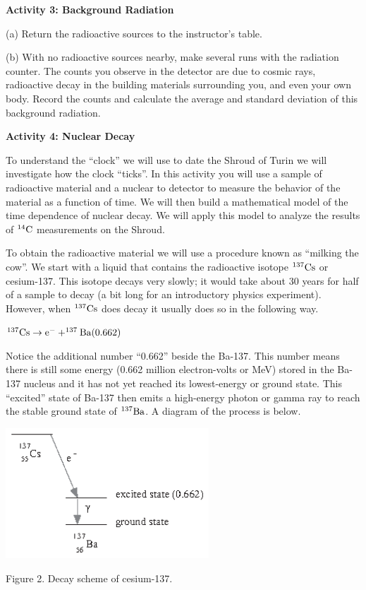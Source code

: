 \textbf{Activity 3: Background Radiation}

(a) Return the radioactive sources to the instructor's table.

(b) With no radioactive sources nearby, make several runs with the radiation counter.
The counts you observe in the detector are due to cosmic rays, radioactive decay
in the building materials surrounding you, and even your own body.
Record the counts and calculate the average and standard deviation of this background
radiation.
\answerspace{15mm}

\pagebreak[2]
\textbf{Activity 4: Nuclear Decay }

To understand the ``clock'' we will use to date the Shroud of Turin we will investigate
how the clock ``ticks''.
In this activity you will use a sample of radioactive material and a nuclear to 
detector to measure the behavior of the material as a function of time.
We will then build a mathematical model of the time dependence of nuclear decay.
We will apply this model to analyze the results of $\rm ^{14}C$ measurements on
the Shroud.

To obtain the radioactive material we will use a procedure known as
``milking the cow''.
We start with a liquid that contains the radioactive isotope $\rm ^{137}Cs$ or
cesium-137.
This isotope decays very slowly; it would take about 30 years for half of a sample
to decay (a bit long for an introductory physics experiment).
However, when $\rm ^{137}Cs$ does decay it usually does so in the following way.

{\centering \( \rm ^{137}Cs \rightarrow e^- + ^{137}Ba(0.662) \) \par}

Notice the additional number ``0.662'' beside the Ba-137. This number means there
is still some energy (0.662 million electron-volts or MeV)
stored in the Ba-137 nucleus and it has not yet reached
its lowest-energy or ground state.
This ``excited'' state of Ba-137 then emits a high-energy photon or gamma ray to 
reach the stable ground state of $\rm {^{137}Ba}$. A diagram of the
process is below. 

\vspace{-0.3cm}
\begin{center}
\includegraphics[width=3in]{radiocarbon_dating/Cs-137_decay_bw.eps}
\vspace{-0.6cm}

Figure 2. Decay scheme of cesium-137. 
\end{center}

